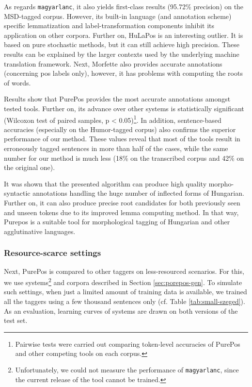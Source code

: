 As regards \texttt{magyarlanc}, it also yields first-class results (95.72\% precision) on the MSD-tagged corpus.
However, its built-in language (and annotation scheme) specific lemmatization and label-transformation components inhibit its application on other corpora. 
Further on, HuLaPos is an interesting outlier.
It is based on pure stochastic methods, but it can still achieve high precision. 
These results can be explained by the larger contexts used by the underlying machine translation framework.
Next, Morfette also provides accurate annotations (concerning \acrshort{pos} labels only), however, it has problems with computing the roots of words.

Results show that PurePos provides the most accurate annotations amongst tested tools.
Further on, its advance over other systems is statistically significant (Wilcoxon test of paired samples, p < 0.05)\footnote{Pairwise tests were carried out comparing token-level accuracies of PurePos and other competing tools on each corpus.}.
In addition, sentence-based accuracies (especially on the Humor-tagged corpus) also confirms the superior performance of our method. 
These values reveal that most of the tools result in erroneously tagged sentences in more than half of the cases, while the same number for our method is much less (18\% on the transcribed corpus and 42\% on the original one). 

It was shown that the presented algorithm can produce high quality morpho-syntactic annotations handling the huge number of inflected forms of Hungarian.
Further on, it can also produce precise root candidates for both previously seen and unseen tokens due to its improved lemma computing method.
In that way, Purepos is a suitable tool for morphological tagging of Hungarian and other agglutinative languages.
%

\subsubsection{Resource-scarce settings}

Next, PurePos is compared to other taggers on less-resourced scenarios.
For this, we use systems\footnote{Unfortunately, we could not measure the performance of \texttt{magyarlanc}, since the current release of the tool cannot be trained.}  and corpora described in Section \ref{sec:porepos-gen}.
To simulate such settings, when just a limited amount of training data is available, we trained all the taggers using a few thousand sentences only (cf. Table \ref{tab:small-szeged}).
As an evaluation, learning curves of systems are drawn on both versions of the test set.

